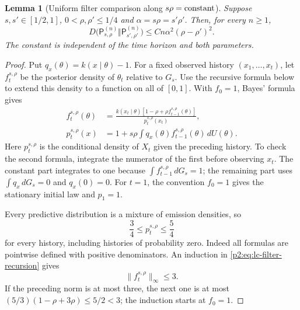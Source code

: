 \documentclass[11pt,a4paper]{article}
\newtheorem{lemma}[theorem]{Lemma}
\theoremstyle{definition}
\theoremstyle{remark}
\numberwithin{equation}{section}
\begin{document}
\begin{lemma}[Uniform filter comparison along $s\rho=\textnormal{constant}$]
\label{p2:lem:lc-filter}
Suppose $s,s'\in[1/2,1]$, $0<\rho,\rho'\le1/4$ and
$\alpha=s\rho=s'\rho'$.  Then, for every $n\ge1$,
\begin{equation}\label{p2:eq:lc-path-kl}
 D\bigl(\mathsf P^{(n)}_{s,\rho}
             \Vert\mathsf P^{(n)}_{s',\rho'}\bigr)
       \le Cn\alpha^2(\rho-\rho')^2.
\end{equation}
The constant is independent of the time horizon and both parameters.
\end{lemma}
\begin{proof}
Put $q_x(\theta)=k(x\mid\theta)-1$.  For a fixed observed history
$(x_1,\ldots,x_t)$, let $f_t^{s,\rho}$ be the posterior density of
$\theta_t$ relative to $G_s$.  Use the recursive formula below to extend
this density to a function on all of $[0,1]$.  With $f_0=1$, Bayes' formula
gives
\begin{align}
 f_t^{s,\rho}(\theta)
   &=\frac{k(x_t\mid\theta)
                    [1-\rho+\rho f_{t-1}^{s,\rho}(\theta)]}
           {p_t^{s,\rho}(x_t)},\label{p2:eq:lc-filter-recursion}\\
 p_t^{s,\rho}(x)
   &=1+s\rho\int q_x(\theta)
                         f_{t-1}^{s,\rho}(\theta)\,dU(\theta).
                         \label{p2:eq:lc-predictive}
\end{align}
Here $p_t^{s,\rho}$ is the conditional density of $X_t$ given the preceding
history.  To check the second formula, integrate the numerator of the first
before observing $x_t$.  The constant part integrates to one because
$\int f_{t-1}^{s,\rho}\,dG_s=1$; the remaining part uses
$\int q_x\,dG_s=0$ and $q_x(0)=0$.  For $t=1$, the convention $f_0=1$
gives the stationary initial law and $p_1=1$.

Every predictive distribution is a mixture of emission densities, so
\begin{equation}\label{p2:eq:lc-predictive-bounds}
 \frac34\le p_t^{s,\rho}\le\frac54
\end{equation}
for every history, including histories of probability zero.  Indeed all
formulas are pointwise defined with positive denominators.
An induction in \eqref{p2:eq:lc-filter-recursion} gives
\begin{equation}\label{p2:eq:lc-filter-bound}
 \|f_t^{s,\rho}\|_\infty\le3.
\end{equation}
If the preceding norm is at most three, the next one is at most
$(5/3)(1-\rho+3\rho)\le5/2<3$; the induction starts at $f_0=1$.


\end{proof}
\end{document}
